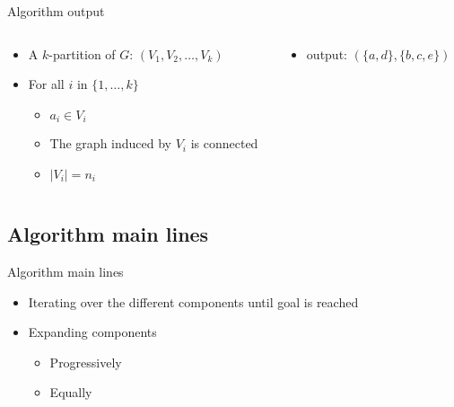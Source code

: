 \begin{frame}{Algorithm output}
  \begin{columns}[c]
    \begin{column}[T]{.5\textwidth}
      \begin{itemize}
      \item A $k$-partition of $G$: $(V_1,V_2, \dots, V_k)$
      \item For all $i$ in $\{1, \dots, k\}$
        \begin{itemize}
        \item $a_i \in V_i$
        \item The graph induced by $V_i$ is connected
        \item $|V_i| = n_i$
        \end{itemize}
      \end{itemize}
    \end{column}
    \begin{column}[T]{.5\textwidth}
      \begin{itemize}
      \item output: $(\{a,d\},\{b,c,e\})$
      \end{itemize}
      \begin{tikzpicture}[scale=0.5]
        
      \end{tikzpicture}
    \end{column}
  \end{columns}
\end{frame}

\subsection{Algorithm main lines}

\begin{frame}{Algorithm main lines}
  \begin{itemize}
  \item Iterating over the different components until goal is reached
  \item Expanding components
    \begin{itemize}
    \item Progressively
    \item Equally
    \end{itemize}
  \end{itemize}
  \begin{center}
  \end{center}
\end{frame}

